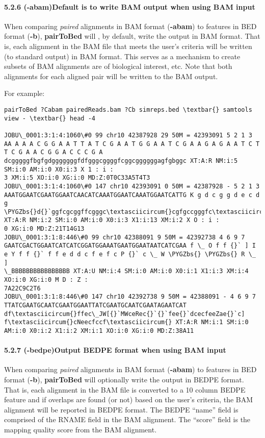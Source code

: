 \documentclass[letterpaper,10pt,english]{sphinxmanual}
\def\PYGZbs{\char`\\}
\begin{document}
\paragraph{5.2.6 (-abam)Default is to write BAM output when using BAM input}
\label{content/pairToBed:abam-default-is-to-write-bam-output-when-using-bam-input}
When comparing \emph{paired} alignments in BAM format (\textbf{-abam}) to features in BED format (\textbf{-b}),
\textbf{pairToBed} will , by default, write the output in BAM format. That is, each alignment in the BAM
file that meets the user's criteria will be written (to standard output) in BAM format. This serves as a
mechanism to create subsets of BAM alignments are of biological interest, etc. Note that both
alignments for each aligned pair will be written to the BAM output.

For example:

\begin{Verbatim}[commandchars=\\\{\}]
pairToBed ?Cabam pairedReads.bam ?Cb simreps.bed \textbar{} samtools view - \textbar{} head -4

JOBU\_0001:3:1:4:1060\#0 99 chr10 42387928 29 50M = 42393091 5 2 1 3
AA A A A C G G A A T T A T C G A A T G G A A T C G A A G A G A A T C T T C G A A C G G A C C C G A
dcgggggfbgfgdgggggggfdfgggcggggfcggcggggggagfgbggc XT:A:R NM:i:5 SM:i:0 AM:i:0 X0:i:3 X 1 : i :
3 XM:i:5 XO:i:0 XG:i:0 MD:Z:0T0C33A5T4T3
JOBU\_0001:3:1:4:1060\#0 147 chr10 42393091 0 50M = 42387928 - 5 2 1 3
AAATGGAATCGAATGGAATCAACATCAAATGGAATCAAATGGAATCATTG K g d c g g d e c d g
\PYGZbs{}d{}`ggfcgcggffcgggc\textasciicircum{}cgfgccgggfc\textasciicircum{}gcdgg\PYGZbs{}bg XT:A:R NM:i:2 SM:i:0 AM:i:0 X0:i:3 X1:i:13 XM:i:2 X O : i :
0 XG:i:0 MD:Z:21T14G13
JOBU\_0001:3:1:8:446\#0 99 chr10 42388091 9 50M = 42392738 4 6 9 7
GAATCGACTGGAATCATCATCGGATGGAAATGAATGGAATAATCATCGAA f \_ O f f {}` ] I e Y f f {}` f f e d d c f e f c P {}` c \_ W \PYGZbs{} \PYGZbs{} R \_ ]
\_BBBBBBBBBBBBBBBB XT:A:U NM:i:4 SM:i:0 AM:i:0 X0:i:1 X1:i:3 XM:i:4 XO:i:0 XG:i:0 M D : Z :
7A22C9C2T6
JOBU\_0001:3:1:8:446\#0 147 chr10 42392738 9 50M = 42388091 - 4 6 9 7
TTATCGAATGCAATCGAATGGAATTATCGAATGCAATCGAATAGAATCAT df\textasciicircum{}ffec\_JW[{}`MWceRec{}`{}`fee{}`dcecfeeZae{}`c]
f\textasciicircum{}cNeecfccf\textasciicircum{} XT:A:R NM:i:1 SM:i:0 AM:i:0 X0:i:2 X1:i:2 XM:i:1 XO:i:0 XG:i:0 MD:Z:38A11
\end{Verbatim}


\paragraph{5.2.7 (-bedpe)Output BEDPE format when using BAM input}
\label{content/pairToBed:bedpe-output-bedpe-format-when-using-bam-input}
When comparing \emph{paired} alignments in BAM format (\textbf{-abam}) to features in BED format (\textbf{-b}),
\textbf{pairToBed} will optionally write the output in BEDPE format. That is, each alignment in the BAM
file is converted to a 10 column BEDPE feature and if overlaps are found (or not) based on the user's
criteria, the BAM alignment will be reported in BEDPE format. The BEDPE ``name'' field is comprised
of the RNAME field in the BAM alignment. The ``score'' field is the mapping quality score from the
BAM alignment.
\end{document}
